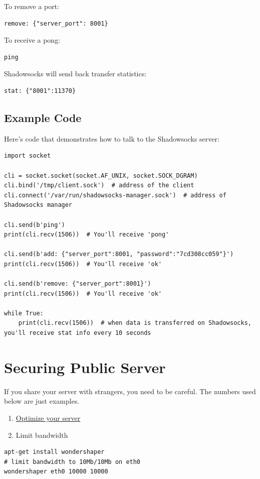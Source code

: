 \documentclass[11pt,a4paper]{sphinxmanual}
\begin{document}
To remove a port:
\begin{Verbatim}
remove: {"server_port": 8001}
\end{Verbatim}

To receive a pong:
\begin{Verbatim}
ping
\end{Verbatim}

Shadowsocks will send back transfer statistics:
\begin{Verbatim}
stat: {"8001":11370}
\end{Verbatim}

\subsection{Example Code}
\label{sec-6-1-3}
Here's code that demonstrates how to talk to the Shadowsocks server:
\begin{verbatim}
import socket

cli = socket.socket(socket.AF_UNIX, socket.SOCK_DGRAM)
cli.bind('/tmp/client.sock')  # address of the client
cli.connect('/var/run/shadowsocks-manager.sock')  # address of Shadowsocks manager

cli.send(b'ping')
print(cli.recv(1506))  # You'll receive 'pong'

cli.send(b'add: {"server_port":8001, "password":"7cd308cc059"}')
print(cli.recv(1506))  # You'll receive 'ok'

cli.send(b'remove: {"server_port":8001}')
print(cli.recv(1506))  # You'll receive 'ok'

while True:
    print(cli.recv(1506))  # when data is transferred on Shadowsocks, you'll receive stat info every 10 seconds
\end{verbatim}


\section{Securing Public Server}
\label{sec-6-2}
If you share your server with strangers, you need to be careful. The numbers used below are just examples.

\begin{enumerate}
\item \hyperref[sec:optimizing_shadowsocks]{Optimize your server}
\item Limit bandwidth
\end{enumerate}
\begin{Verbatim}
apt-get install wondershaper
# limit bandwidth to 10Mb/10Mb on eth0
wondershaper eth0 10000 10000
\end{Verbatim}
\end{document}
